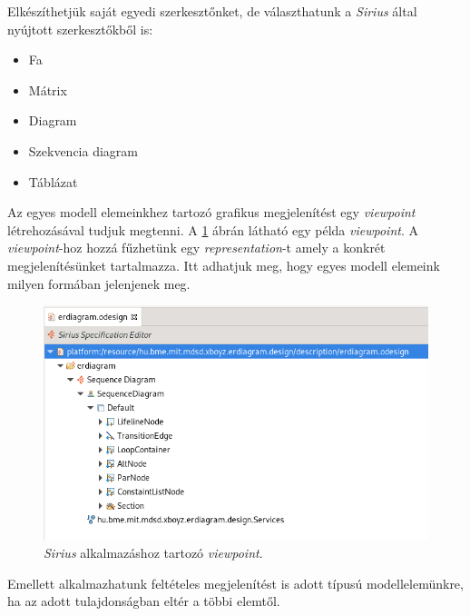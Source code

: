 Elkészíthetjük saját egyedi szerkesztőnket, de választhatunk a \textit{Sirius} által nyújtott szerkesztőkből is:
\begin{itemize}
	\item Fa
	\item Mátrix
	\item Diagram
	\item Szekvencia diagram
	\item Táblázat
\end{itemize}

Az egyes modell elemeinkhez tartozó grafikus megjelenítést egy \textit{viewpoint} létrehozásával tudjuk megtenni.
A \ref{sirius_viewpoint} ábrán látható egy példa \textit{viewpoint}.
A \textit{viewpoint}-hoz hozzá fűzhetünk egy \textit{representation}-t amely a konkrét megjelenítésünket tartalmazza.
Itt adhatjuk meg, hogy egyes modell elemeink milyen formában jelenjenek meg.

\begin{figure}[!ht]
    \centering
    \includegraphics[width=150mm, keepaspectratio]{figures/sirius_viewpoint.png}
    \caption{\textit{Sirius} alkalmazáshoz tartozó \textit{viewpoint}.}
    \label{sirius_viewpoint}
\end{figure}

Emellett alkalmazhatunk feltételes megjelenítést is adott típusú modellelemünkre, ha az adott tulajdonságban eltér a többi elemtől.